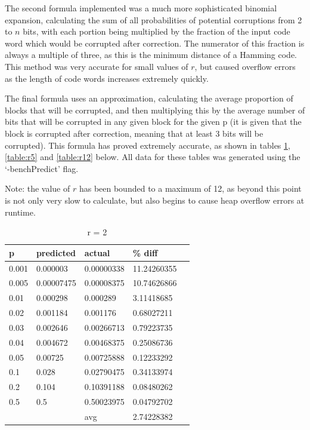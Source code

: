 \documentclass[a4paper,11pt]{article}
\begin{document}
        The second formula implemented was a much more sophisticated binomial expansion, calculating the sum of all probabilities of potential corruptions from 2 to $n$ bits, with each portion being multiplied by the fraction of the input code word which would be corrupted after correction. The numerator of this fraction is always a multiple of three, as this is the minimum distance of a Hamming code. This method was very accurate for small values of $r$, but caused overflow errors as the length of code words increases extremely quickly.

        The final formula uses an approximation, calculating the average proportion of blocks that will be corrupted, and then multiplying this by the average number of bits that will be corrupted in any given block for the given p (it is given that the block is corrupted after correction, meaning that at least 3 bits will be corrupted). This formula has proved extremely accurate, as shown in tables \ref{table:r2}, \ref{table:r5} and \ref{table:r12} below. All data for these tables was generated using the `-benchPredict' flag.

        Note: the value of $r$ has been bounded to a maximum of 12, as beyond this point is not only very slow to calculate, but also begins to cause heap overflow errors at runtime.

        \begin{table}
        \centering
            \caption {r = 2}
            \label{table:r2}
            \begin{tabular}{l|llll}
            p    & predicted  & actual     & \% diff     \\\hline
            0.001 & 0.000003   & 0.00000338 & 11.24260355 \\
            0.005 & 0.00007475 & 0.00008375 & 10.74626866 \\
            0.01  & 0.000298   & 0.000289   & 3.11418685  \\
            0.02  & 0.001184   & 0.001176   & 0.68027211  \\
            0.03  & 0.002646   & 0.00266713 & 0.79223735  \\
            0.04  & 0.004672   & 0.00468375 & 0.25086736  \\
            0.05  & 0.00725    & 0.00725888 & 0.12233292  \\
            0.1   & 0.028      & 0.02790475 & 0.34133974  \\
            0.2   & 0.104      & 0.10391188 & 0.08480262  \\
            0.5   & 0.5        & 0.50023975 & 0.04792702  \\\hline
            ~     & ~          & avg        & 2.74228382  \\
            \end{tabular}
        \end{table}
\end{document}
